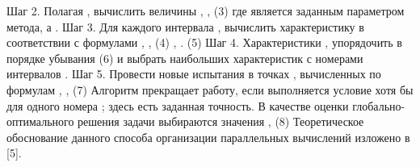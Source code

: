 Шаг 2. Полагая  , вычислить величины 
 ,  ,	(3)
где   является заданным параметром метода, а  .
Шаг 3. Для каждого интервала  , вычислить характеристику в соответствии с формулами
 ,  ,				(4)
 ,  .			(5)
Шаг 4. Характеристики  , упорядочить в порядке убывания 
	 				(6)
и выбрать   наибольших характеристик с номерами интервалов  .
Шаг 5. Провести новые испытания в точках  , вычисленных по формулам
 ,  
 ,  	(7)
Алгоритм прекращает работу, если выполняется условие   хотя бы для одного номера  ; здесь   есть заданная точность. В качестве оценки глобально-оптимального решения задачи  выбираются значения 
 ,  				(8)
Теоретическое обоснование данного способа организации параллельных вычислений изложено в [5].
